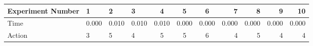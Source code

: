 \documentclass[8pt]{article}
\begin{document}
\begin{landscape}
\begin{tabular}{ | l | l | l | l | c | c | c | r | r | r | r | }
 \hline 
Experiment Number & 1 & 2 & 3 & 4 & 5 & 6 & 7 & 8 & 9 & 10\\ \hline
Time & 0.000 & 0.010 & 0.010 & 0.010 & 0.000 & 0.000 & 0.000 & 0.000 & 0.000 & 0.000\\ \hline
Action & 3 & 5 & 4 & 5 & 5 & 6 & 4 & 5 & 4 & 4\\ \hline\end{tabular}
\end{landscape}
\end{document}
